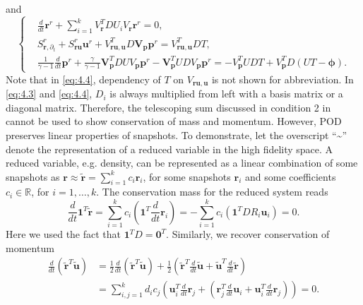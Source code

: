 and
\begin{equation} \label{eq:4.4}
\left\{
\begin{aligned}
	& \frac{d}{dt} \mathbf r^r + \sum_{i=1}^k V^T_{\mathbf r}DU_iV_{\mathbf r}\mathbf r^r = 0, \\
	& S^r_{\mathbf r ,\partial_t} + S^r _{\mathbf r \mathbf u} \mathbf u^r + V_{\mathbf r \mathbf u, \mathbf u}^T D \mathbf V_{\mathbf p} \mathbf p^r = V_{\mathbf r \mathbf u, \mathbf u}^T D T, \\
	&\frac{1}{\gamma -1} \frac{d}{dt} \mathbf p^r + \frac{\gamma}{\gamma -1} \mathbf V_{\mathbf p}^T D U V_{\mathbf p} \mathbf p^r - \mathbf V_{\mathbf p}^T UD V_{\mathbf p} \mathbf p^r = - V_{\mathbf p}^T UDT + V_{\mathbf p}^T D(UT - \mathbf \phi).
\end{aligned}
\right.
\end{equation}
Note that in \eqref{eq:4.4}, dependency of $T$ on $V_{\mathbf r \mathbf u , \mathbf u}$ is not shown for abbreviation. In \eqref{eq:4.3} and \eqref{eq:4.4}, $D_i$ is always multiplied from left with a basis matrix or a diagonal matrix. Therefore, the telescoping sum discussed in condition 2 in  cannot be used to show conservation of mass and momentum. However, POD preserves linear properties of snapshots. To demonstrate, let the overscript ``\textasciitilde'' denote the representation of a reduced variable in the high fidelity space. A reduced variable, e.g. density, can be represented as a linear combination of some snapshots as $\mathbf r \approx \tilde{\mathbf r} = \sum_{i=1}^k c_i \mathbf r_i$, for some snapshots $\mathbf r_i$ and some coefficients $c_i \in \mathbb R$, for $i=1,\dots,k$. The conservation mass for the reduced system reads
\begin{equation} \label{eq:4.5}
	\frac{d}{dt} \mathbf 1^T \tilde {\mathbf r} = \sum_{i=1}^k c_i  \left( \mathbf 1^T \frac{d}{dt} \mathbf r_i \right) = - \sum_{i=1}^k c_i  \left( \mathbf 1^T DR_i\mathbf u_i \right) = 0.
\end{equation}
Here we used the fact that $\mathbf 1^T D = \mathbf 0^T$. Similarly, we recover conservation of momentum
\begin{equation} \label{eq:4.6}
\begin{aligned}
	\frac{d}{dt}(\tilde {\mathbf r}^T \tilde{\mathbf u}) &= \frac{1}{2} \frac{d}{dt}(\tilde{\mathbf r}^T \tilde{\mathbf u}) + \frac{1}{2} \left( \tilde{ \mathbf r }^T \frac d{dt} \tilde{ \mathbf u } + \tilde {\mathbf u}^T \frac{d}{dt} \tilde {\mathbf r} \right)\\
	&= \sum_{i,j=1}^k d_i c_j \left( \mathbf u_i^T \frac{d}{dt} \mathbf r_j + \left( \mathbf r_j^T \frac d{dt} \mathbf u_i +\mathbf u_i^T \frac{d}{dt} \mathbf r_j \right)\right) = 0.\\
\end{aligned}
\end{equation}

